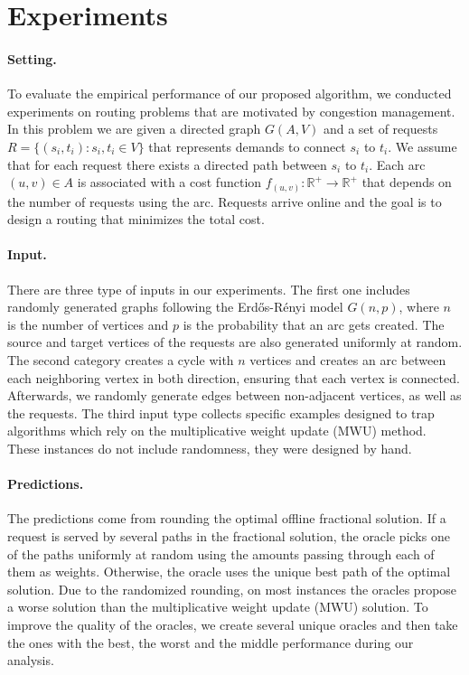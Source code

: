 
\section{Experiments}

\paragraph{Setting.}
To evaluate the empirical performance of our proposed algorithm, we conducted experiments on routing problems
that are motivated by congestion management.
In this problem we are given a directed graph $G(A,V)$ and a set of requests $R = \{(s_{i}, t_{i}) : s_{i}, t_{i} \in V\}$ that represents demands to connect $s_{i}$ to $t_{i}$. We assume that for each request there exists a directed path between $s_{i}$ to $t_{i}$.
Each arc $(u, v) \in A$ is associated with a cost function $f_{(u,v)}: \mathbb{R}^{+} \rightarrow \mathbb{R}^{+}$ that depends on the number of requests using the arc.
Requests arrive online and the goal is to design a routing that minimizes the total cost.


\paragraph{Input.}
There are three type of inputs in our experiments. The first one includes randomly generated graphs following the Erd\H{o}s-Rényi model $G(n, p)$, where $n$ is the number of vertices and $p$ is the probability that an arc gets created. The source and target vertices of the requests are also generated uniformly at random. The second category creates a cycle with $n$ vertices and creates an arc between each neighboring vertex in both direction, ensuring that each vertex is connected. Afterwards, we randomly generate edges between non-adjacent vertices, as well as the requests.
The third input type collects specific examples designed to trap algorithms which rely on the multiplicative weight update (MWU) method. These instances do not include randomness, they were designed by hand.


\paragraph{Predictions.}
The predictions come from rounding the optimal offline fractional solution. If a request is served by several paths in the fractional solution, the oracle picks one of the paths uniformly at random using the amounts passing through each of them as weights. Otherwise, the oracle uses the unique best path of the optimal solution. Due to the randomized rounding, on most instances the oracles propose a worse solution than the multiplicative weight update (MWU) solution. To improve the quality of the oracles, we create several unique oracles and then take the ones with the best, the worst and the middle performance during our analysis.


